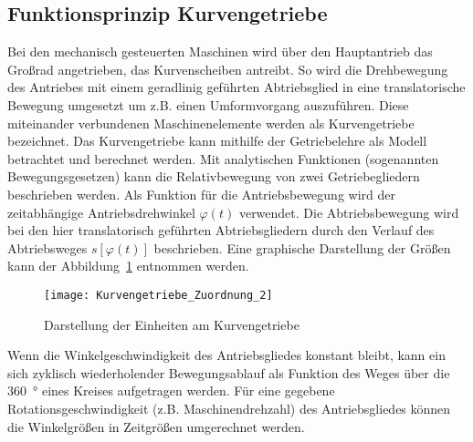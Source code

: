 

\subsection{Funktionsprinzip Kurvengetriebe}\label{cha:Funktionsprinzip Kurvengetriebe}


Bei den mechanisch gesteuerten Maschinen wird über den Hauptantrieb das Großrad angetrieben, das Kurvenscheiben antreibt. So wird die Drehbewegung des Antriebes mit einem geradlinig geführten Abtriebsglied in eine translatorische Bewegung umgesetzt um z.B. einen Umformvorgang auszuführen. Diese miteinander verbundenen Maschinenelemente werden als Kurvengetriebe bezeichnet. Das Kurvengetriebe kann mithilfe der Getriebelehre als Modell betrachtet und berechnet werden. Mit analytischen Funktionen (sogenannten Bewegungsgesetzen) kann die Relativbewegung von zwei Getriebegliedern beschrieben werden. Als Funktion für die Antriebsbewegung wird der zeitabhängige Antriebsdrehwinkel $\varphi(t)$ verwendet. Die Abtriebsbewegung wird bei den hier translatorisch geführten Abtriebsgliedern durch den Verlauf des Abtriebsweges $s[\varphi(t)]$ beschrieben. Eine graphische Darstellung der Größen kann der Abbildung~\ref{fig:Kurvengetriebe_Funktionsbild} \cite{VDI2002} entnommen werden. 

\begin{figure}[h]
\centering
\texttt{[image: Kurvengetriebe\_Zuordnung\_2]} 



\caption{Darstellung der Einheiten am Kurvengetriebe} 
\label{fig:Kurvengetriebe_Funktionsbild}
\end{figure}

Wenn die Winkelgeschwindigkeit des Antriebsgliedes konstant bleibt, kann ein sich zyklisch wiederholender Bewegungsablauf als Funktion des Weges über die \SI{360}{\degree} eines Kreises aufgetragen werden. Für eine gegebene Rotationsgeschwindigkeit (z.B. Maschinendrehzahl) des Antriebsgliedes können die Winkelgrößen in Zeitgrößen umgerechnet werden. 














